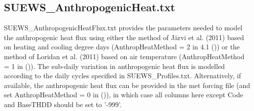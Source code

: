 \documentclass[letterpaper,10pt,english]{sphinxmanual}
\begin{document}
\subsection{SUEWS\_AnthropogenicHeat.txt}
\label{\detokenize{input_files/SUEWS_SiteInfo/SUEWS_AnthropogenicHeat::doc}}\label{\detokenize{input_files/SUEWS_SiteInfo/SUEWS_AnthropogenicHeat:suews-anthropogenicheat-txt}}\label{\detokenize{input_files/SUEWS_SiteInfo/SUEWS_AnthropogenicHeat:id1}}
SUEWS\_AnthropogenicHeatFlux.txt provides the parameters needed to model
the anthropogenic heat flux using either the method of Järvi et al.
(2011) based on heating and cooling degree days (AnthropHeatMethod = 2
in 4.1 {\hyperref[\detokenize{input_files/RunControl/RunControl:runcontrol-nml}]{}} ()) or the method of Loridan et
al. (2011) based on air temperature (AnthropHeatMethod = 1 in
{\hyperref[\detokenize{input_files/RunControl/RunControl:runcontrol-nml}]{}} ()). The sub-daily variation in
anthropogenic heat flux is modelled according to the daily cycles
specified in SUEWS\_Profiles.txt. Alternatively, if available, the
anthropogenic heat flux can be provided in the met forcing file (and set
AnthropHeatMethod = 0 in {\hyperref[\detokenize{input_files/RunControl/RunControl:runcontrol-nml}]{}} ()), in which
case all columns here except Code and BaseTHDD should be set to ’-999’.
\end{document}
